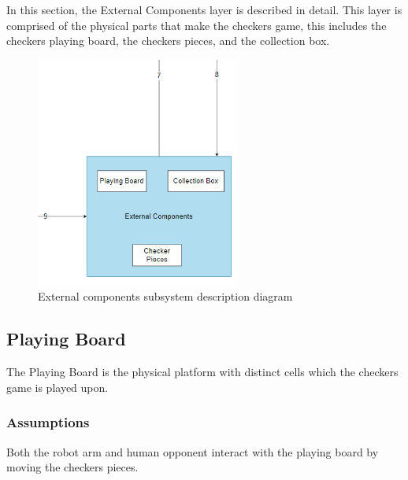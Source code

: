 
In this section, the External Components layer is described in detail. This layer is comprised of the physical parts that make the checkers game, this includes the checkers playing board, the checkers pieces, and the collection box.

\begin{figure}[h!]
	\centering
 	\includegraphics[width=0.60\textwidth]{images/externalComponents_subsystem.png}
 \caption{External components subsystem description diagram}
\end{figure}

\subsection{Playing Board}
The Playing Board is the physical platform with distinct cells which the checkers game is played upon. 

\subsubsection{Assumptions}
Both the robot arm and human opponent interact with the playing board by moving the checkers pieces.

